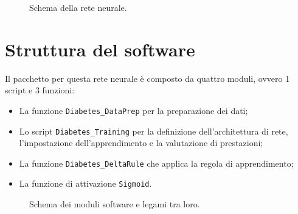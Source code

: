 \documentclass[a4paper,12pt]{article}
\begin{document}
\begin{figure}[htb]
  \center
  \caption{Schema della rete neurale.}
  \label{fig:modello}
\end{figure}



\newpage
\section{Struttura del software} %

Il pacchetto per questa rete neurale è composto da quattro moduli, ovvero 1 script e 3 funzioni:
\begin{itemize}
    \item La funzione \texttt{Diabetes\_DataPrep} per la preparazione dei dati;
    \item Lo script \texttt{Diabetes\_Training} per la definizione dell'architettura di rete, l'impostazione dell'apprendimento e la valutazione di prestazioni;
    \item La funzione \texttt{Diabetes\_DeltaRule} che applica la regola di apprendimento;
    \item La funzione di attivazione \texttt{Sigmoid}.
\end{itemize}

\begin{figure}[htb]
  \centering
  \caption{Schema dei moduli software e legami tra loro.}
  \label{fig:schema-software}
\end{figure}
\end{document}
